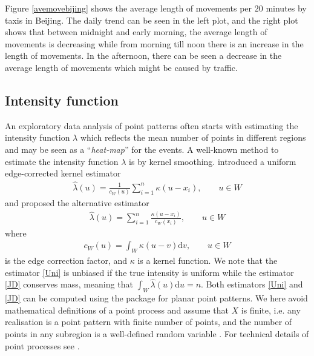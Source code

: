 \documentclass[article]{jss}
\newcommand{\de}{\mathrm{d}}
\begin{document}
Figure \ref{avemovebijing} shows the average length of movements per $20$ minutes by taxis in Beijing. The daily trend can be seen in the left plot, and the right plot shows that between midnight and early morning, the average length of movements is decreasing while from morning till noon there is an increase in the length of movements. In the afternoon, there can be seen a decrease in the average length of movements which might be caused by traffic.

\subsection{Intensity function}\label{sec:intensity}
  An exploratory data analysis of point patterns often starts with estimating the intensity function $\lambda$ which reflects the mean number of points in different regions and may be seen as a ``\textit{heat-map}'' for the events. A well-known method to estimate the intensity function $\lambda$ is by kernel smoothing. \cite{D85} introduced a uniform edge-corrected kernel estimator
  \begin{eqnarray}\label{Uni}
  \widehat{\lambda}(u)=\frac{1}{c_W(u)}\sum\limits_{i=1}^{n} \kappa(u-x_i), \qquad u \in W
  \end{eqnarray}
  and \cite{jones93} proposed the alternative estimator
  \begin{eqnarray}\label{JD}
  \widehat{\lambda}(u)=\sum\limits_{i=1}^{n} \frac{\kappa(u-x_i)}{c_W(x_i)}, \qquad u \in W 
  \end{eqnarray}
  where
  \begin{eqnarray}
  c_W(u)=\int_W \kappa(u-v) \de v, \qquad u \in W
  \end{eqnarray}
  is the edge correction factor, and $\kappa$ is a kernel function. We note that the estimator \eqref{Uni} is unbiased if the true intensity is uniform while the estimator \eqref{JD} conserves mass, meaning that $\int_W \hat{\lambda}(u) \de u =n$. Both estimators \eqref{Uni} and \eqref{JD} can be computed using the  package  for planar point patterns. We here avoid mathematical definitions of a point process and assume that $X$ is finite, i.e. any realisation is a point pattern with finite number of points, and the number of points in any subregion is a well-defined random variable \citep{BRT15}. For technical details of point processes see \citep{MW03,daley07}.
  
\end{document}

